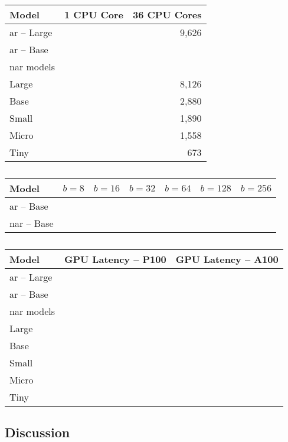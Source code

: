 \begin{table}
  \centering

  \begin{tabular}{lrr}
    \toprule
    Model & 1 CPU Core & 36 CPU Cores \\
    \midrule
    \acs{ar} -- Large & & 9,626 \\
    \acs{ar} -- Base & & \\
    \midrule
    \Acl{nar} models \\
    Large & & 8,126 \\
    Base  & & 2,880 \\
    Small & & 1,890 \\
    Micro & & 1,558 \\
    Tiny  & &   673 \\
    \bottomrule
  \end{tabular}

  \caption{}%
  \label{tab:}
\end{table}


\begin{table}
  \centering

  \begin{tabular}{l*{6}r}
    \toprule
    Model & $b=8$ & $b=16$ & $b=32$ & $b=64$ & $b=128$ & $b=256$ \\
    \midrule
    \acs{ar} -- Base \\
    \acs{nar} -- Base \\
    \bottomrule
  \end{tabular}

  \caption{}%
  \label{tab:}
\end{table}



\begin{table}
  \centering

  \begin{tabular}{lrr}
    \toprule
    Model & GPU Latency -- P100 & GPU Latency -- A100 \\
    \midrule
    \acs{ar} -- Large & & \\
    \acs{ar} -- Base & & \\
    \midrule
    \Acl{nar} models \\
    Large & & \\
    Base  & & \\
    Small & & \\
    Micro & & \\
    Tiny  & & \\
    \bottomrule
  \end{tabular}

  \caption{}%
  \label{tab:}
\end{table}

\subsection{Discussion}%
\label{subsec:results:discussion}



